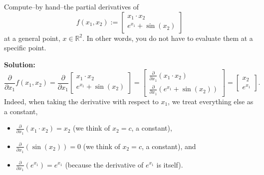 \begin{center}
\setlength{\fboxrule}{2pt}  %
\end{center}

\begin{example}
Compute--by hand--the partial derivatives of
\[
f(x_1, x_2) := \left[ \begin{array}{c} x_1 \cdot x_2 \\ e^{x_1} + \sin(x_2) \end{array}\right]
\]
at a general point, \(x \in \mathbb{R}^2\). In other words, you do not have to evaluate them at a specific point.
\end{example}

\textbf{Solution:}
\[
\frac{\partial}{\partial x_1} f(x_1, x_2) = \frac{\partial}{\partial x_1} \left[ \begin{array}{c} x_1 \cdot x_2 \\ e^{x_1} + \sin(x_2) \end{array}\right] = \left[ \begin{array}{l} \frac{\partial}{\partial x_1}( x_1 \cdot x_2) \\ \frac{\partial}{\partial x_1}(e^{x_1} + \sin(x_2)) \end{array}\right]= \left[ \begin{array}{c} x_2 \\ e^{x_1}\end{array}\right].
\]
Indeed, when taking the derivative with respect to \(x_1\), we treat everything else as a constant,
\begin{itemize}
\item \(\frac{\partial}{\partial x_1}(x_1 \cdot x_2) = x_2\) (we think of \(x_2=c\), a constant),
\item \(\frac{\partial}{\partial x_1}(\sin(x_2)) = 0\) (we think of \(x_2=c\), a constant), and
\item \(\frac{\partial}{\partial x_1}(e^{x_1}) = e^{x_1}\) (because the derivative of \(e^{x_1}\) is itself).
\end{itemize}


